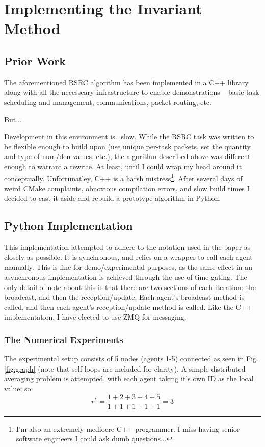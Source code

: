 \documentclass[11pt]{article}
\begin{document}
\section{Implementing the Invariant Method}
\subsection*{Prior Work}
The aforementioned RSRC algorithm has been implemented in a C++ library along with all the necesscary
infrastructure to enable demonstrations -- basic task scheduling and management,
communications, packet routing, etc.

\medskip
\noindent
But...

\medskip
\noindent
\noindent
Development in this environment is...slow. While the RSRC task was written to be flexible enough to
build upon (use unique per-task packets, set the quantity and type of num/den
values, etc.), the algorithm described above was different enough to warrant a
rewrite. At least, until I could wrap my head around it conceptually.
Unfortunatley, C++ is a harsh mistress\footnote{I'm also an extremely mediocre
    C++ programmer. I miss having senior software engineers I could ask dumb
    questions...}. After several days of weird CMake complaints, obnoxious
compilation errors, and slow build times I decided to cast it aside and rebuild
a prototype algorithm in Python.

\subsection*{Python Implementation}
This implementation attempted to adhere to the notation used in the paper as
closely as possible. It is synchronous, and relies on a wrapper to call each
agent manually. This is fine for demo/experimental purposes, as the same effect
in an asynchronous implementation is achieved through the use of time gating.
The only detail of note about this is that there are two sections of each
iteration: the broadcast, and then the reception/update.  Each agent's broadcast
method is called, and then each agent's reception/update method is called.
Like the C++ implementation, I have elected to use ZMQ for messaging.

\subsubsection*{The Numerical Experiments}
The experimental setup consists of 5 nodes (agents 1-5) connected as seen in
Fig. \ref{fig:graph} (note that self-loops are included for clarity). A simple
distributed averaging problem is attempted, with each agent taking it's own ID as the local value; so:
\[ r^* = \frac{1 + 2 + 3 + 4 + 5}{1 + 1 + 1 + 1 + 1} = 3 \]
\end{document}
